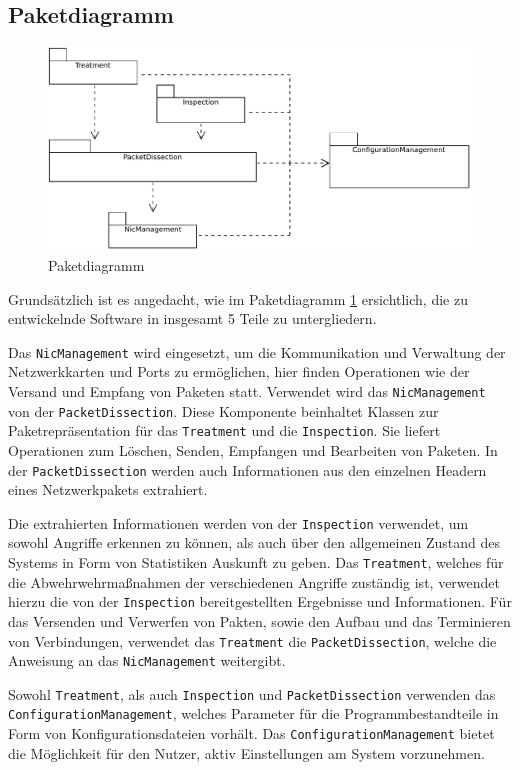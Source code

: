 \documentclass[../review_3.tex]{subfiles}
\begin{document}
\subsection{Paketdiagramm}

\begin{figure}[H]
    \centering
    \includegraphics[width=0.82\linewidth]{img/packet_diagram.pdf}
    \caption{Paketdiagramm}
    \label{fig:dospaketdiagramm}
\end{figure}
Grundsätzlich ist es angedacht, wie im Paketdiagramm \ref{fig:dospaketdiagramm} ersichtlich, die zu entwickelnde Software in insgesamt 5 Teile zu untergliedern.

Das \texttt{NicManagement} wird eingesetzt, um die Kommunikation und Verwaltung der Netzwerkkarten und Ports zu ermöglichen, hier finden Operationen wie der Versand und Empfang von Paketen statt. Verwendet wird das \texttt{NicManagement} von der \texttt{PacketDissection}. Diese Komponente beinhaltet Klassen zur Paketrepräsentation für das \texttt{Treatment} und die \texttt{Inspection}. Sie liefert Operationen zum Löschen, Senden, Empfangen und Bearbeiten von Paketen. In der \texttt{PacketDissection} werden auch Informationen aus den einzelnen Headern eines Netzwerkpakets extrahiert.

Die extrahierten Informationen werden von der \texttt{Inspection} verwendet, um sowohl Angriffe erkennen zu können, als auch über den allgemeinen Zustand des Systems in Form von Statistiken Auskunft zu geben. Das \texttt{Treatment}, welches für die Abwehrwehrmaßnahmen der verschiedenen Angriffe zuständig ist, verwendet hierzu die von der \texttt{Inspection} bereitgestellten Ergebnisse und Informationen. Für das Versenden und Verwerfen von Pakten, sowie den Aufbau und das Terminieren von Verbindungen, verwendet das \texttt{Treatment} die \texttt{PacketDissection}, welche die Anweisung an das \texttt{NicManagement} weitergibt.

Sowohl \texttt{Treatment}, als auch \texttt{Inspection} und \texttt{PacketDissection} verwenden das \\ \texttt{ConfigurationManagement}, welches Parameter für die Programmbestandteile in Form von Konfigurationsdateien vorhält. Das \texttt{ConfigurationManagement} bietet die Möglichkeit für den Nutzer, aktiv Einstellungen am System vorzunehmen.
\end{document}
